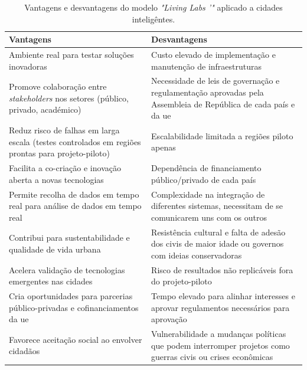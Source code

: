 \begin{table}[H]
\centering
\footnotesize
\begin{tabular}{|p{8cm}|p{8cm}|}
\hline
\textbf{Vantagens} & \textbf{Desvantagens} \\
\hline
Ambiente real para testar soluções inovadoras & Custo elevado de implementação e manutenção de infraestruturas \\
\hline
Promove colaboração entre \textit{stakeholders} nos setores (público, privado, académico) & Necessidade de leis de governação e regulamentação aprovadas pela Assembleia de República de cada país e da \gls{ue} \\
\hline
Reduz risco de falhas em larga escala (testes controlados em regiões prontas para projeto-piloto) & Escalabilidade limitada a regiões piloto apenas \\
\hline
Facilita a co-criação e inovação aberta a novas tecnologias & Dependência de financiamento público/privado de cada país \\
\hline
Permite recolha de dados em tempo real para análise de dados em tempo real & Complexidade na integração de diferentes sistemas, necessitam de se comunicarem uns com os outros \\
\hline
Contribui para sustentabilidade e qualidade de vida urbana & Resistência cultural e falta de adesão dos civis de maior idade ou governos com ideias conservadoras \\
\hline
Acelera validação de tecnologias emergentes nas cidades & Risco de resultados não replicáveis fora do projeto-piloto \\
\hline
Cria oportunidades para parcerias público-privadas e cofinanciamentos da \gls{ue} & Tempo elevado para alinhar interesses e aprovar regulamentos necessários para aprovação \\
\hline
Favorece aceitação social ao envolver cidadãos & Vulnerabilidade a mudanças políticas que podem interromper projetos como guerras civis ou crises econômicas \\
\hline
\end{tabular}
\caption{Vantagens e desvantagens do modelo \textit{"Living Labs '"} aplicado a cidades inteligêntes.}
\label{tab:livinglabs}
\end{table}
